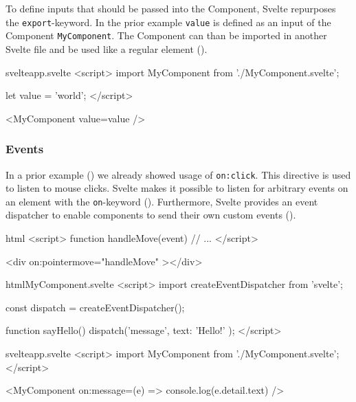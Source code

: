 To define inputs that should be passed into the Component, Svelte repurposes the \texttt{export}-keyword. In the prior example \texttt{value} is defined as an input of the Component \texttt{MyComponent}. The Component can than be imported in another Svelte file and be used like a regular element ().

\begin{listing}[H]
\begin{myminted}{svelte}{app.svelte}
<script>
  import MyComponent from './MyComponent.svelte';

  let value = 'world';
</script>

<MyComponent value={value} />
\end{myminted}
\caption{Example usage of a custom Svelte component.}
\label{fig:svelte-component-usage}
\end{listing}

\subsubsection{Events}

In a prior example () we already showed usage of \texttt{on:click}. This directive is used to listen to mouse clicks. Svelte makes it possible to listen for arbitrary events on an element with the \texttt{on}-keyword (). Furthermore, Svelte provides an event dispatcher to enable components to send their own custom events ().

\begin{listing}[H]
\begin{myminted}[highlightlines={7}]{html}{}
<script>
  function handleMove(event) {
    // ...
  }
</script>

<div on:pointermove="{handleMove}" ></div>
\end{myminted}
\caption{Usage of the \texttt{on:}-directive to listen to \texttt{pointermove} events.}
\label{fig:svelte-on-directive}
\end{listing}


\begin{listing}[H]
\begin{myminted}{html}{MyComponent.svelte}
<script>
  import { createEventDispatcher } from 'svelte';

  const dispatch = createEventDispatcher();

  function sayHello() {
    dispatch('message', { text: 'Hello!' });
  }
</script>
\end{myminted}
\begin{myminted}{svelte}{app.svelte}
<script>
  import MyComponent from './MyComponent.svelte';
</script>

<MyComponent on:message={(e) => console.log(e.detail.text)} />
\end{myminted}
\caption{Usage of the event dispatcher to send custom events.}
\label{fig:svelte-custom-event}
\end{listing}

